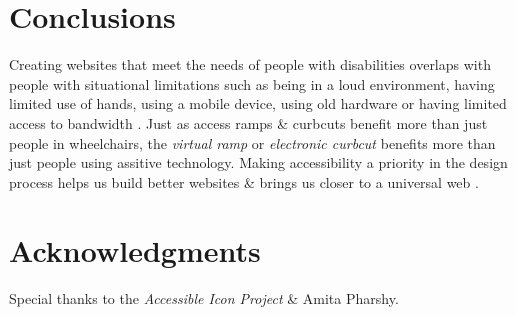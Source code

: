 \documentclass{acm_proc_article-sp}
\begin{document}
\section{Conclusions}
Creating websites that meet the needs of people with disabilities overlaps with people with situational limitations such as being in a loud environment, having limited use of hands, using a mobile device, using old hardware or having limited access to bandwidth \cite{henry:role}. Just as access ramps \& curbcuts benefit more than just people in wheelchairs, the \textit{virtual ramp} or \textit{electronic curbcut} \cite{jacobs:curb} benefits more than just people using assitive technology. Making accessibility a priority in the design process helps us build better websites \& brings us closer to a universal web \cite{henry:role}.

\section{Acknowledgments}
Special thanks to the {\it Accessible Icon Project} \& Amita Pharshy.
\end{document}
